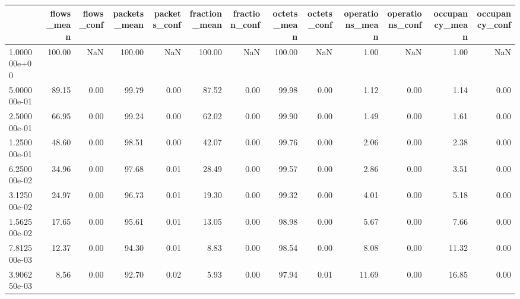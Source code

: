 \begin{tabular}{lrrrrrrrrrrrr}
\toprule
{} &  flows\_mean &  flows\_conf &  packets\_mean &  packets\_conf &  fraction\_mean &  fraction\_conf &  octets\_mean &  octets\_conf &  operations\_mean &  operations\_conf &  occupancy\_mean &  occupancy\_conf \\
\midrule
1.000000e+00 &      100.00 &         NaN &        100.00 &           NaN &         100.00 &            NaN &       100.00 &          NaN &             1.00 &              NaN &            1.00 &             NaN \\
5.000000e-01 &       89.15 &        0.00 &         99.79 &          0.00 &          87.52 &           0.00 &        99.98 &         0.00 &             1.12 &             0.00 &            1.14 &            0.00 \\
2.500000e-01 &       66.95 &        0.00 &         99.24 &          0.00 &          62.02 &           0.00 &        99.90 &         0.00 &             1.49 &             0.00 &            1.61 &            0.00 \\
1.250000e-01 &       48.60 &        0.00 &         98.51 &          0.00 &          42.07 &           0.00 &        99.76 &         0.00 &             2.06 &             0.00 &            2.38 &            0.00 \\
6.250000e-02 &       34.96 &        0.00 &         97.68 &          0.01 &          28.49 &           0.00 &        99.57 &         0.00 &             2.86 &             0.00 &            3.51 &            0.00 \\
3.125000e-02 &       24.97 &        0.00 &         96.73 &          0.01 &          19.30 &           0.00 &        99.32 &         0.00 &             4.01 &             0.00 &            5.18 &            0.00 \\
1.562500e-02 &       17.65 &        0.00 &         95.61 &          0.01 &          13.05 &           0.00 &        98.98 &         0.00 &             5.67 &             0.00 &            7.66 &            0.00 \\
7.812500e-03 &       12.37 &        0.00 &         94.30 &          0.01 &           8.83 &           0.00 &        98.54 &         0.00 &             8.08 &             0.00 &           11.32 &            0.00 \\
3.906250e-03 &        8.56 &        0.00 &         92.70 &          0.02 &           5.93 &           0.00 &        97.94 &         0.01 &            11.69 &             0.00 &           16.85 &            0.00 \\

\end{tabular}
